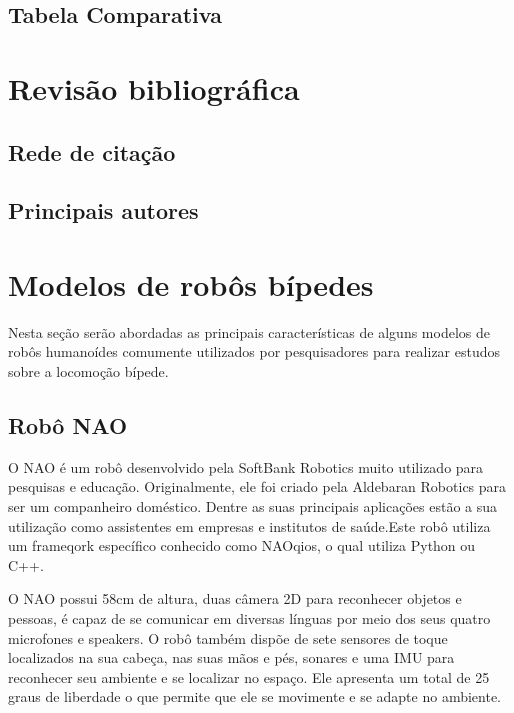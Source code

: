 \subsection{Tabela Comparativa}
\label{ssec:tabela}







\section{Revisão bibliográfica}
\label{sec:biblio}

\subsection{Rede de citação}
\label{ssec:rede}

\subsection{Principais autores}
\label{ssec:autor}


\section{Modelos de robôs bípedes}
\label{sec:modelos}

Nesta seção serão abordadas as principais características de alguns modelos de robôs humanoídes comumente utilizados por pesquisadores para realizar estudos sobre a locomoção bípede.


\subsection{Robô NAO}
\label{ssec:nao}

O NAO é um robô desenvolvido pela SoftBank Robotics muito utilizado para pesquisas e educação. Originalmente, ele foi criado pela Aldebaran Robotics para ser um companheiro doméstico. Dentre as suas principais aplicações estão a sua utilização como assistentes em empresas e institutos de saúde.Este robô utiliza um frameqork específico conhecido como NAOqios, o qual utiliza Python ou C++.  

O NAO possui 58cm de altura, duas câmera 2D para reconhecer objetos e pessoas, é capaz de se comunicar em diversas línguas por meio dos seus quatro microfones e speakers. O robô também dispõe de sete sensores de toque localizados na sua cabeça, nas suas mãos e pés, sonares e uma IMU para reconhecer seu ambiente e se localizar no espaço. Ele apresenta um total de 25 graus de liberdade o que permite que ele se movimente e se adapte no ambiente.

